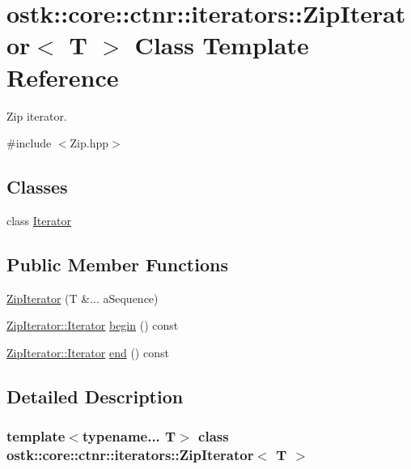 \hypertarget{classostk_1_1core_1_1ctnr_1_1iterators_1_1_zip_iterator}{}\section{ostk\+:\+:core\+:\+:ctnr\+:\+:iterators\+:\+:Zip\+Iterator$<$ T $>$ Class Template Reference}
\label{classostk_1_1core_1_1ctnr_1_1iterators_1_1_zip_iterator}


Zip iterator.  




{\ttfamily \#include $<$Zip.\+hpp$>$}

\subsection*{Classes}
\begin{DoxyCompactItemize}
\item 
class \hyperlink{classostk_1_1core_1_1ctnr_1_1iterators_1_1_zip_iterator_1_1_iterator}{Iterator}
\end{DoxyCompactItemize}
\subsection*{Public Member Functions}
\begin{DoxyCompactItemize}
\item 
\hyperlink{classostk_1_1core_1_1ctnr_1_1iterators_1_1_zip_iterator_ac3ac6cb006cd9428ea66235a9d240221}{Zip\+Iterator} (T \&... a\+Sequence)
\item 
\hyperlink{classostk_1_1core_1_1ctnr_1_1iterators_1_1_zip_iterator_1_1_iterator}{Zip\+Iterator\+::\+Iterator} \hyperlink{classostk_1_1core_1_1ctnr_1_1iterators_1_1_zip_iterator_a9fd76a0b2306f00757c5a09accef725a}{begin} () const
\item 
\hyperlink{classostk_1_1core_1_1ctnr_1_1iterators_1_1_zip_iterator_1_1_iterator}{Zip\+Iterator\+::\+Iterator} \hyperlink{classostk_1_1core_1_1ctnr_1_1iterators_1_1_zip_iterator_a470a84ee17b1e6ac0a92602cb97fca1a}{end} () const
\end{DoxyCompactItemize}


\subsection{Detailed Description}
\subsubsection*{template$<$typename... T$>$\newline
class ostk\+::core\+::ctnr\+::iterators\+::\+Zip\+Iterator$<$ T $>$}

